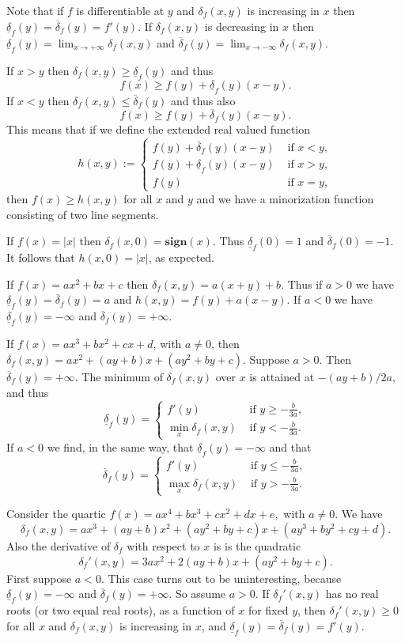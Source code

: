\documentclass[
  12pt,
]{book}
\begin{document}
Note that if \(f\) is differentiable at
\(y\) and \(\delta_f(x,y)\) is increasing in \(x\) then
\(\underline{\delta}_f(y)=\overline{\delta}_f(y)=f'(y)\). If
\(\delta_f(x,y)\) is decreasing in \(x\) then
\(\underline{\delta}_f(y)=\lim_{x\rightarrow+\infty}\delta_f(x,y)\) and
\(\overline{\delta}_f(y)=\lim_{x\rightarrow-\infty}\delta_f(x,y)\).

If \(x>y\) then \(\delta_f(x,y)\geq\underline{\delta}_f(y)\) and thus
\[
f(x)\geq f(y)+\underline{\delta}_f(y)(x-y).
\]
If \(x<y\) then \(\delta_f(x,y)\leq\overline{\delta}_f(y)\) and thus
also
\[
f(x)\geq f(y)+\overline{\delta}_f(y)(x-y).
\]
This means that if we define the extended real valued function
\[
h(x,y):=\begin{cases} f(y)+\overline{\delta}_f(y)(x-y)&\text{ if }x<y,\\
f(y)+\underline{\delta}_f(y)(x-y)&\text{ if }x>y,\\
f(y)&\text{ if }x=y,
\end{cases}
\]
then \(f(x)\geq h(x,y)\) for all \(x\) and \(y\) and we have a minorization
function consisting of two line segments.

If \(f(x)=|x|\) then \(\delta_f(x,0)=\mathbf{sign}(x)\). Thus \(\underline{\delta}_f(0)=1\) and \(\overline{\delta}_f(0)=-1\).
It follows that \(h(x,0)=|x|\), as expected.

If \(f(x)=ax^2+bx+c\) then \(\delta_f(x,y)=a(x+y)+b\). Thus if \(a>0\) we have
\(\underline{\delta}_f(y)=\overline{\delta}_f(y)=a\) and \(h(x,y)=f(y)+a(x-y)\).
If \(a<0\) we have
\(\underline{\delta}_f(y)=-\infty\) and \(\overline{\delta}_f(y)=+\infty\).

If \(f(x)=ax^3+bx^2+cx+d\), with \(a\not= 0\), then \(\delta_f(x,y)=ax^2+(ay+b)x+(ay^2+by+c)\).
Suppose
\(a>0\). Then \(\overline{\delta}_f(y)=+\infty\). The minimum of \(\delta_f(x,y)\) over \(x\) is attained at
\(-(ay+b)/2a\), and thus
\[
 \underline{\delta}_f(y)=\begin{cases}
 f'(y)&\text{ if }y\geq-\frac{b}{3a},\\
 \min_x\delta_f(x,y)&\text{ if }y<-\frac{b}{3a}.
 \end{cases}
 \]
If \(a<0\) we find, in the same way, that \(\underline{\delta}_f(y)=-\infty\) and that
\[
 \overline{\delta}_f(y)=\begin{cases}
 f'(y)&\text{ if }y\leq-\frac{b}{3a},\\
 \max_x\delta_f(x,y)&\text{ if }y>-\frac{b}{3a}.
 \end{cases}
 \]

Consider the quartic
\(f(x)=ax^4+bx^3+cx^2+dx+e,\)
with \(a\not= 0\).
We have
\[
\delta_f(x,y)=ax^3+(ay+b)x^2+(ay^2+by+c)x+(ay^3+by^2+cy+d).
\]
Also the derivative of \(\delta_f\) with respect to \(x\) is
is the quadratic
\[
\delta_f'(x,y)=3ax^2+2(ay+b)x+(ay^2+by+c).
\]
First suppose \(a<0\). This case turns out to be uninteresting, because
\(\underline{\delta}_f(y)=-\infty\) and \(\overline{\delta}_f(y)=+\infty\).
So assume \(a>0\). If \(\delta_f'(x,y)\) has no real roots (or two equal real roots), as a function of \(x\) for fixed \(y\), then
\(\delta_f'(x,y)\geq 0\) for all \(x\) and \(\delta_f(x,y)\) is increasing in \(x\), and \(\underline{\delta}_f(y)=\overline{\delta}_f(y)=f'(y)\).
\end{document}
